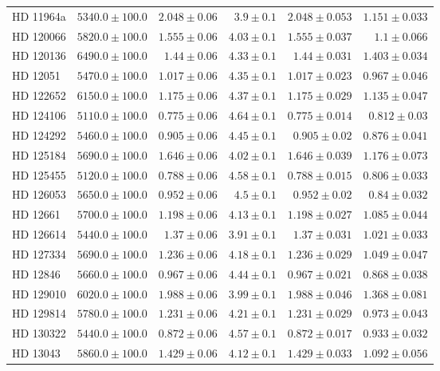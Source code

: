 \begin{longtable*}{lrrrrr}
HD 11964a & $5340.0\pm 100.0$ & $2.048\pm 0.06$ & $3.9\pm 0.1$ & $2.048\pm 0.053$ & $1.151\pm 0.033$ \\ 
HD 120066 & $5820.0\pm 100.0$ & $1.555\pm 0.06$ & $4.03\pm 0.1$ & $1.555\pm 0.037$ & $1.1\pm 0.066$ \\ 
HD 120136 & $6490.0\pm 100.0$ & $1.44\pm 0.06$ & $4.33\pm 0.1$ & $1.44\pm 0.031$ & $1.403\pm 0.034$ \\ 
HD 12051 & $5470.0\pm 100.0$ & $1.017\pm 0.06$ & $4.35\pm 0.1$ & $1.017\pm 0.023$ & $0.967\pm 0.046$ \\ 
HD 122652 & $6150.0\pm 100.0$ & $1.175\pm 0.06$ & $4.37\pm 0.1$ & $1.175\pm 0.029$ & $1.135\pm 0.047$ \\ 
HD 124106 & $5110.0\pm 100.0$ & $0.775\pm 0.06$ & $4.64\pm 0.1$ & $0.775\pm 0.014$ & $0.812\pm 0.03$ \\ 
HD 124292 & $5460.0\pm 100.0$ & $0.905\pm 0.06$ & $4.45\pm 0.1$ & $0.905\pm 0.02$ & $0.876\pm 0.041$ \\ 
HD 125184 & $5690.0\pm 100.0$ & $1.646\pm 0.06$ & $4.02\pm 0.1$ & $1.646\pm 0.039$ & $1.176\pm 0.073$ \\ 
HD 125455 & $5120.0\pm 100.0$ & $0.788\pm 0.06$ & $4.58\pm 0.1$ & $0.788\pm 0.015$ & $0.806\pm 0.033$ \\ 
HD 126053 & $5650.0\pm 100.0$ & $0.952\pm 0.06$ & $4.5\pm 0.1$ & $0.952\pm 0.02$ & $0.84\pm 0.032$ \\ 
HD 12661 & $5700.0\pm 100.0$ & $1.198\pm 0.06$ & $4.13\pm 0.1$ & $1.198\pm 0.027$ & $1.085\pm 0.044$ \\ 
HD 126614 & $5440.0\pm 100.0$ & $1.37\pm 0.06$ & $3.91\pm 0.1$ & $1.37\pm 0.031$ & $1.021\pm 0.033$ \\ 
HD 127334 & $5690.0\pm 100.0$ & $1.236\pm 0.06$ & $4.18\pm 0.1$ & $1.236\pm 0.029$ & $1.049\pm 0.047$ \\ 
HD 12846 & $5660.0\pm 100.0$ & $0.967\pm 0.06$ & $4.44\pm 0.1$ & $0.967\pm 0.021$ & $0.868\pm 0.038$ \\ 
HD 129010 & $6020.0\pm 100.0$ & $1.988\pm 0.06$ & $3.99\pm 0.1$ & $1.988\pm 0.046$ & $1.368\pm 0.081$ \\ 
HD 129814 & $5780.0\pm 100.0$ & $1.231\pm 0.06$ & $4.21\pm 0.1$ & $1.231\pm 0.029$ & $0.973\pm 0.043$ \\ 
HD 130322 & $5440.0\pm 100.0$ & $0.872\pm 0.06$ & $4.57\pm 0.1$ & $0.872\pm 0.017$ & $0.933\pm 0.032$ \\ 
HD 13043 & $5860.0\pm 100.0$ & $1.429\pm 0.06$ & $4.12\pm 0.1$ & $1.429\pm 0.033$ & $1.092\pm 0.056$ \\ 

\end{longtable*}
